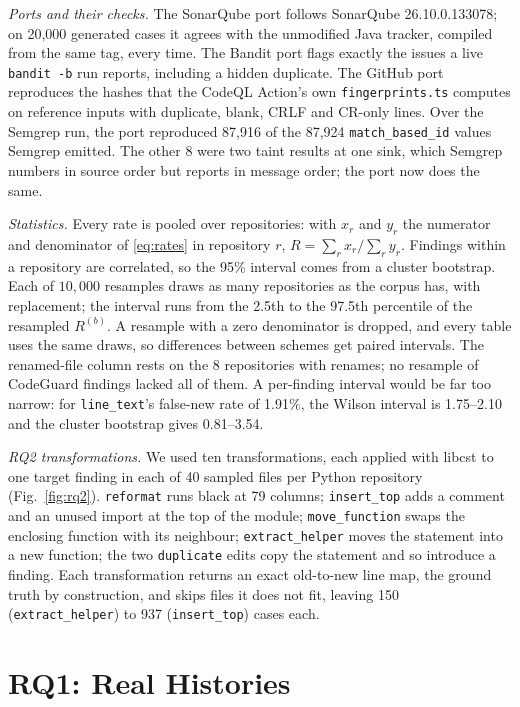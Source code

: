 \documentclass[conference]{IEEEtran}
\begin{document}
\textit{Ports and their checks.} The SonarQube port follows SonarQube 26.10.0.133078; on
20,000 generated cases it agrees with the unmodified Java tracker, compiled from the
same tag, every time. The Bandit port flags exactly the issues a live
\texttt{bandit -b} run reports, including a hidden duplicate. The GitHub port reproduces
the hashes that the CodeQL Action's own \texttt{fingerprints.ts} computes on reference inputs with
duplicate, blank, CRLF and CR-only lines. Over the Semgrep run, the port
reproduced 87,916 of the 87,924 \texttt{match\_based\_id} values Semgrep emitted. The
other 8 were two taint results at one sink, which Semgrep numbers in source order but
reports in message order; the port now does the same.

\textit{Statistics.} Every rate is pooled over repositories: with $x_r$ and $y_r$ the
numerator and denominator of \eqref{eq:rates} in repository $r$,
$R = \sum_r x_r / \sum_r y_r$. Findings within a repository are correlated, so the 95\%
interval comes from a cluster bootstrap. Each of $10{,}000$ resamples draws as many
repositories as the corpus has, with replacement; the interval runs from the 2.5th to
the 97.5th percentile of the resampled $R^{(b)}$. A resample with a zero
denominator is dropped, and every table uses the same draws, so differences between
schemes get paired intervals. The renamed-file column rests on the 8 repositories with
renames; no resample of CodeGuard findings lacked all of them. A per-finding interval
would be far too narrow: for \texttt{line\_text}'s false-new rate of 1.91\%, the Wilson
interval is 1.75--2.10 and the cluster bootstrap gives 0.81--3.54.

\textit{RQ2 transformations.} We used ten transformations, each applied with libcst to one
target finding in each of 40 sampled files per Python repository (Fig.~\ref{fig:rq2}).
\texttt{reformat} runs black at 79 columns; \texttt{insert\_top} adds a comment and an
unused import at the top of the module; \texttt{move\_function} swaps the enclosing
function with its neighbour; \texttt{extract\_helper} moves the statement into a new
function; the two \texttt{duplicate} edits copy the statement and so introduce a
finding. Each transformation returns an exact old-to-new line map, the ground truth by
construction, and skips files it does not fit, leaving 150 (\texttt{extract\_helper}) to
937 (\texttt{insert\_top}) cases each.

\section{RQ1: Real Histories}\label{sec:rq1}
\end{document}
